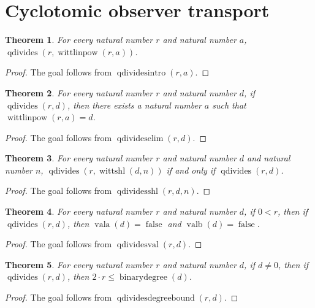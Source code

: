 \documentclass[11pt]{article}
\newtheorem{theorem}{Theorem}[section]
\theoremstyle{definition}
\begin{document}
\section{Cyclotomic observer transport}
\label{ll:observations:observer-q-adic}
\begin{theorem}
\label{ll:observations:q-divides-intro}
For every natural number \(r\) and natural number \(a\), \(\operatorname{qdivides}(r, \operatorname{wittlinpow}(r, a))\).
\end{theorem}
\begin{proof}
The goal follows from \(\operatorname{qdividesintro}(r, a)\).
\end{proof}
\begin{theorem}
\label{ll:observations:q-divides-elim}
For every natural number \(r\) and natural number \(d\), if \(\operatorname{qdivides}(r, d)\), then there exists a natural number \(a\) such that \(\operatorname{wittlinpow}(r, a) = d\).
\end{theorem}
\begin{proof}
The goal follows from \(\operatorname{qdivideselim}(r, d)\).
\end{proof}
\begin{theorem}
\label{ll:observations:q-divides-shl}
For every natural number \(r\) and natural number \(d\) and natural number \(n\), \(\operatorname{qdivides}(r, \operatorname{wittshl}(d, n))\) if and only if \(\operatorname{qdivides}(r, d)\).
\end{theorem}
\begin{proof}
The goal follows from \(\operatorname{qdividesshl}(r, d, n)\).
\end{proof}
\begin{theorem}
\label{ll:observations:q-divides-val}
For every natural number \(r\) and natural number \(d\), if \(0 < r\), then if \(\operatorname{qdivides}(r, d)\), then \(\operatorname{vala}(d) = \operatorname{false}\) and \(\operatorname{valb}(d) = \operatorname{false}\).
\end{theorem}
\begin{proof}
The goal follows from \(\operatorname{qdividesval}(r, d)\).
\end{proof}
\begin{theorem}
\label{ll:observations:q-divides-degree-bound}
For every natural number \(r\) and natural number \(d\), if \(d \ne 0\), then if \(\operatorname{qdivides}(r, d)\), then \(2 \cdot r \le \operatorname{binarydegree}(d)\).
\end{theorem}
\begin{proof}
The goal follows from \(\operatorname{qdividesdegreebound}(r, d)\).
\end{proof}
\end{document}
